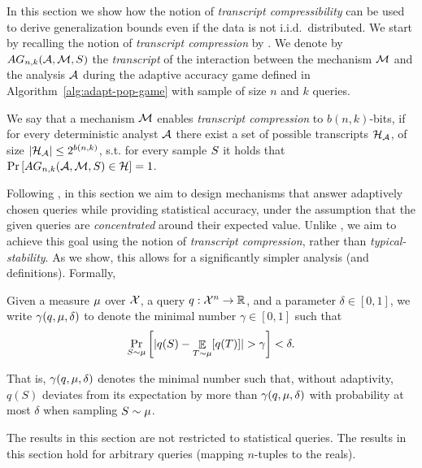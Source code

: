 \documentclass[12pt,a4paper,oneside,onecolumn]{book}
\begin{document}
In this section we show how the notion of \emph{transcript compressibility} can be used to derive generalization bounds %
even if the data is not i.i.d.\ distributed. We start by recalling the notion of {\em transcript compression} by \citet{dwork2015generalization}. 
We denote by $AG_{n,k}(\mathcal{A},\mathcal{M},S)$ the \emph{transcript} of the interaction between the mechanism $\mathcal{M}$ and the analysis $\mathcal{A}$ during the adaptive accuracy game defined in Algorithm~\ref{alg:adapt-pop-game} with sample of size $n$ and $k$ queries. 
\begin{definition}\label{def:compression}
  We say that a mechanism $\mathcal{M}$  enables
  \emph{transcript compression} to $b(n,k)$-bits,
  if for every deterministic analyst $\mathcal{A}$ there exist
  a set of possible transcripts $\mathcal{H}_{\mathcal{A}}$,
  of size $\lvert\mathcal{H}_{\mathcal{A}}\rvert \leq 2^{b(n,k)}$,
  s.t. for every sample $S$ it holds that 
  $\Pr\left[ AG_{n,k}(\mathcal{A},\mathcal{M},S)\in \mathcal{H} \right] = 1$.
\end{definition}
 
 Following \citet{DBLP:journals/corr/BassilyF16}, in this section we aim to design mechanisms that answer adaptively chosen queries while providing statistical accuracy, under the assumption that the given queries are {\em concentrated} around their expected value. Unlike \citet{DBLP:journals/corr/BassilyF16}, we aim to achieve this goal using the notion of {\em transcript compression}, rather than {\em typical-stability}. As we show, this allows for a significantly simpler analysis (and definitions). Formally,
 
 \begin{definition}\label{def:concentrated}
 Given a measure $\mu$ over $\mathcal{X}$, a query  $q:\mathcal{X}^n\rightarrow\mathbb{R}$, 
 and a parameter $\delta\in[0,1]$, we write $\gamma(q,\mu,\delta)$ to denote the minimal number $\gamma\in[0,1]$ such that
 \[
    \Pr_{S\sim\mu}\left[
      \lvert q(S) - \mathop{\mathbb{E}}_{T\sim \mu}[q(T)]\rvert > \gamma
    \right] < \delta.
  \]
 \end{definition}
 
 That is, $\gamma(q,\mu,\delta)$ denotes the minimal number such that, without adaptivity, $q(S)$ deviates from its expectation by more than $\gamma(q,\mu,\delta)$  with probability at most $\delta$ when sampling $S\sim\mu$. 
 
 \begin{remark}
 The results in this section are not restricted to statistical queries. The results in this section hold for arbitrary queries (mapping $n$-tuples to the reals). 
 \end{remark}
 
\end{document}
